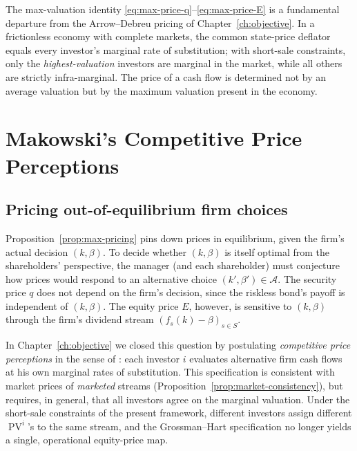 \documentclass[11pt,a4paper,oneside]{book}
\DeclareMathOperator{\PV}{PV}
\theoremstyle{plain}
\theoremstyle{definition}
\theoremstyle{remark}
\numberwithin{equation}{chapter}
\begin{document}
The max-valuation identity \eqref{eq:max-price-q}--\eqref{eq:max-price-E} is a fundamental departure from the Arrow--Debreu pricing of Chapter~\ref{ch:objective}.
In a frictionless economy with complete markets, the common state-price deflator equals every investor's marginal rate of substitution; with short-sale constraints, only the \emph{highest-valuation} investors are marginal in the market, while all others are strictly infra-marginal.
The price of a cash flow is determined not by an average valuation but by the maximum valuation present in the economy.

\section{Makowski's Competitive Price Perceptions}
\label{sec:makowski}

\subsection{Pricing out-of-equilibrium firm choices}

Proposition~\ref{prop:max-pricing} pins down prices in equilibrium, given the firm's actual decision $(k, \beta)$.
To decide whether $(k, \beta)$ is itself optimal from the shareholders' perspective, the manager (and each shareholder) must conjecture how prices would respond to an alternative choice $(k', \beta') \in \mathcal{A}$.
The security price $q$ does not depend on the firm's decision, since the riskless bond's payoff is independent of $(k, \beta)$.
The equity price $E$, however, is sensitive to $(k, \beta)$ through the firm's dividend stream $(f_s(k) - \beta)_{s \in S}$.

In Chapter~\ref{ch:objective} we closed this question by postulating \emph{competitive price perceptions} in the sense of \citet{GrossmanHart1979}: each investor $i$ evaluates alternative firm cash flows at his own marginal rates of substitution.
This specification is consistent with market prices of \emph{marketed} streams (Proposition~\ref{prop:market-consistency}), but requires, in general, that all investors agree on the marginal valuation.
Under the short-sale constraints of the present framework, different investors assign different $\PV^i$'s to the same stream, and the Grossman--Hart specification no longer yields a single, operational equity-price map.
\end{document}
